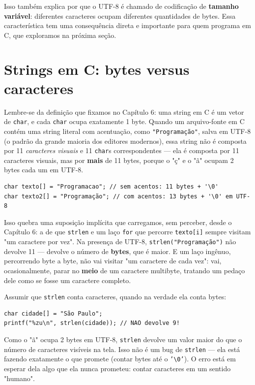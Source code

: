 \documentclass[12pt,a4paper,oneside]{extreport}
\begin{document}
Isso também explica por que o UTF-8 é chamado de codificação de \textbf{tamanho variável}: diferentes caracteres ocupam diferentes quantidades de bytes. Essa característica tem uma consequência direta e importante para quem programa em C, que exploramos na próxima seção.

\section*{Strings em C: bytes versus caracteres}

Lembre-se da definição que fixamos no Capítulo 6: uma string em C é um vetor de \texttt{char}, e cada \texttt{char} ocupa exatamente 1 byte. Quando um arquivo-fonte em C contém uma string literal com acentuação, como \texttt{"Programação"}, salva em UTF-8 (o padrão da grande maioria dos editores modernos), essa string não é composta por 11 \textit{caracteres visuais} e 11 \texttt{char}s correspondentes — ela é composta por 11 caracteres visuais, mas por \textbf{mais} de 11 bytes, porque o "ç" e o "ã" ocupam 2 bytes cada um em UTF-8.

\begin{lstlisting}
char texto[] = "Programacao"; // sem acentos: 11 bytes + '\0'
char texto2[] = "Programação"; // com acentos: 13 bytes + '\0' em UTF-8
\end{lstlisting}

Isso quebra uma suposição implícita que carregamos, sem perceber, desde o Capítulo 6: a de que \texttt{strlen} e um laço \texttt{for} que percorre \texttt{texto[i]} sempre visitam "um caractere por vez". Na presença de UTF-8, \texttt{strlen("Programação")} não devolve 11 — devolve o número de \textbf{bytes}, que é maior. E um laço ingênuo, percorrendo byte a byte, não vai visitar "um caractere de cada vez": vai, ocasionalmente, parar no \textbf{meio} de um caractere multibyte, tratando um pedaço dele como se fosse um caractere completo.

\begin{errocomum}
Assumir que \texttt{strlen} conta caracteres, quando na verdade ela conta bytes:
\begin{lstlisting}
char cidade[] = "São Paulo";
printf("%zu\n", strlen(cidade)); // NAO devolve 9!
\end{lstlisting}
Como o "ã" ocupa 2 bytes em UTF-8, \texttt{strlen} devolve um valor maior do que o número de caracteres visíveis na tela. Isso não é um bug de \texttt{strlen} — ela está fazendo exatamente o que promete (contar bytes até o \texttt{'\textbackslash 0'}). O erro está em esperar dela algo que ela nunca prometeu: contar caracteres em um sentido "humano".
\end{errocomum}
\end{document}
